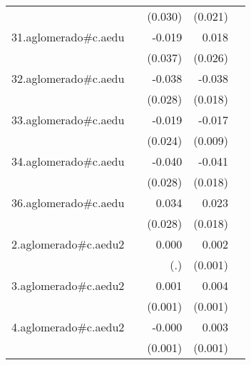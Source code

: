 {\begin{longtable}{l*{4}{D{.}{.}{-1}}}
            &                     &     (0.030)         &     (0.021)         &                     \\
\addlinespace
31.aglomerado#c.aedu&                     &      -0.019         &       0.018         &                     \\
            &                     &     (0.037)         &     (0.026)         &                     \\
\addlinespace
32.aglomerado#c.aedu&                     &      -0.038         &      -0.038\sym{*}  &                     \\
            &                     &     (0.028)         &     (0.018)         &                     \\
\addlinespace
33.aglomerado#c.aedu&                     &      -0.019         &      -0.017         &                     \\
            &                     &     (0.024)         &     (0.009)         &                     \\
\addlinespace
34.aglomerado#c.aedu&                     &      -0.040         &      -0.041\sym{*}  &                     \\
            &                     &     (0.028)         &     (0.018)         &                     \\
\addlinespace
36.aglomerado#c.aedu&                     &       0.034         &       0.023         &                     \\
            &                     &     (0.028)         &     (0.018)         &                     \\
\addlinespace
2.aglomerado#c.aedu2&                     &       0.000         &       0.002\sym{*}  &                     \\
            &                     &         (.)         &     (0.001)         &                     \\
\addlinespace
3.aglomerado#c.aedu2&                     &       0.001         &       0.004\sym{***}&                     \\
            &                     &     (0.001)         &     (0.001)         &                     \\
\addlinespace
4.aglomerado#c.aedu2&                     &      -0.000         &       0.003\sym{***}&                     \\
            &                     &     (0.001)         &     (0.001)         &                     \\

\end{longtable}}
